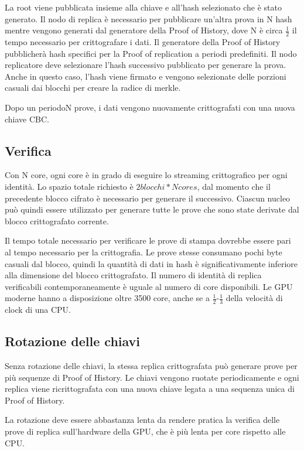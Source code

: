 \documentclass[12pt]{article}
\begin{document}
La root viene pubblicata insieme alla chiave e all'hash selezionato che è stato generato. Il nodo di replica è necessario per pubblicare un'altra prova in N hash mentre vengono generati dal generatore della Proof of History, dove N è circa \(\frac{1}{2}\) il tempo necessario per crittografare i dati. Il generatore della Proof of History pubblicherà hash specifici per la Proof of replication a periodi predefiniti. Il nodo replicatore deve selezionare l'hash successivo pubblicato per generare la prova. Anche in questo caso, l'hash viene firmato e vengono selezionate delle porzioni casuali dai blocchi per creare la radice di merkle.

Dopo un periodoN prove, i dati vengono nuovamente crittografati con una nuova chiave CBC.
\subsection{Verifica}

Con N core, ogni core è in grado di eseguire lo streaming crittografico per ogni identità. Lo spazio totale richiesto è \(2 blocchi * N cores\), dal momento che il precedente blocco cifrato è necessario per generare il successivo. Ciascun nucleo può quindi essere utilizzato per generare tutte le prove che sono state derivate dal blocco crittografato corrente.

Il tempo totale necessario per verificare le prove di stampa dovrebbe essere pari al tempo necessario per la crittografia. Le prove stesse consumano pochi byte casuali dal blocco, quindi la quantità di dati in hash è significativamente inferiore alla dimensione del blocco crittografato. Il numero di identità di replica verificabili contemporaneamente è uguale al numero di core disponibili. Le GPU moderne hanno a disposizione oltre 3500 core, anche se a \(\frac{1}{2}\)-\(\frac{1}{3}\) della velocità di clock di una CPU.

\subsection{Rotazione delle chiavi}

Senza rotazione delle chiavi, la stessa replica crittografata può generare prove per più sequenze di Proof of History. Le chiavi vengono ruotate periodicamente e ogni replica viene ricrittografata con una nuova chiave legata a una sequenza unica di Proof of History.

La rotazione deve essere abbastanza lenta da rendere pratica la verifica delle prove di replica sull'hardware della GPU, che è più lenta per core rispetto alle CPU.
\end{document}
